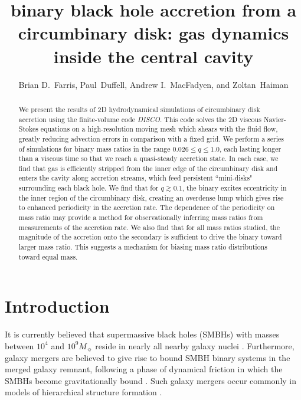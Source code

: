 \documentclass[apj]{emulateapj}
\begin{document}
\author{Brian D.~Farris, Paul~Duffell, Andrew I.~MacFadyen, and Zoltan~Haiman} 

\title{binary black hole accretion from a circumbinary disk: gas dynamics inside the central cavity}

\begin{abstract}
We present the results of 2D hydrodynamical simulations of circumbinary disk accretion using the finite-volume code {\it DISCO}. This code solves the 2D viscous Navier-Stokes equations on a high-resolution moving mesh which shears with the fluid flow, greatly reducing advection errors in comparison with a fixed grid. We perform a series of simulations for binary mass ratios in the range $0.026 \le q \le 1.0$, each lasting longer than a viscous time so that we reach a quasi-steady accretion state. In each case, we find that gas is efficiently stripped from the inner edge of the circumbinary disk and enters the cavity along accretion streams, which feed persistent ``mini-disks" surrounding each black hole. We find that for $q \gtrsim 0.1$, the binary excites eccentricity in the inner region of the circumbinary disk, creating an overdense lump which gives rise to enhanced periodicity in the accretion rate. The dependence of the periodicity on mass ratio may provide a method for observationally inferring mass ratios from measurements of the accretion rate. We also find that for all mass ratios studied, the magnitude of the accretion onto the secondary is sufficient to drive the binary toward larger mass ratio. This suggests a mechanism for biasing mass ratio distributions toward equal mass.
\end{abstract}

\section{Introduction}
It is currently believed that supermassive black holes (SMBHs) with masses between $10^4$ and $10^9 M_{\sun}$ reside in nearly all nearby galaxy nuclei \citep{kormendy95,ferrarese05}. Furthermore, galaxy mergers are believed to give rise to bound SMBH binary systems in the merged galaxy remnant, following a phase of dynamical friction in which the SMBHs become gravitationally bound \citep{begelman80,roos81,merritt05}. Such galaxy mergers occur commonly in models of hierarchical structure formation \citep{haehnelt02}. 
\end{document}
